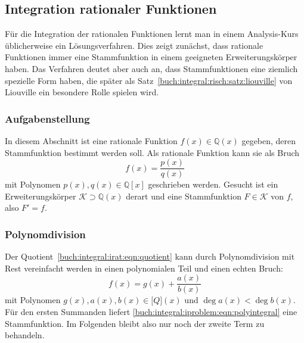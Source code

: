 %
%
%
\subsection{Integration rationaler Funktionen
\label{buch:integral:subsection:rationalefunktionen}}
Für die Integration der rationalen Funktionen lernt man in einem
Analysis-Kurs üblicherweise ein Lösungsverfahren.
Dies zeigt zunächst, dass rationale Funktionen immer eine Stammfunktion
in einem geeigneten Erweiterungskörper haben.
Das Verfahren deutet aber auch an, dass Stammfunktionen eine ziemlich spezielle
Form haben, die später als
Satz~\ref{buch:integral:risch:satz:liouville} von Liouville
ein besondere Rolle spielen wird.

%
%
\subsubsection{Aufgabenstellung}
In diesem Abschnitt ist eine rationale Funktion $f(x)\in\mathbb{Q}(x)$
gegeben, deren Stammfunktion bestimmt werden soll.
Als rationale Funktion kann sie als Bruch
\begin{equation}
f(x) = \frac{p(x)}{q(x)}
\label{buch:integral:irat:eqn:quotient}
\end{equation}
mit Polynomen $p(x),q(x)\in\mathbb{Q}[x]$ geschrieben werden.
Gesucht ist ein Erweiterungskörper $\mathscr{K}\supset \mathbb{Q}(x)$ 
derart und eine Stammfunktion $F\in\mathscr{K}$ von $f$, also $F'=f$.

%
%
\subsubsection{Polynomdivision}
Der Quotient~\eqref{buch:integral:irat:eqn:quotient} kann durch Polynomdivision
mit Rest vereinfacht werden in einen polynomialen Teil und einen echten
Bruch:
\begin{equation}
f(x)
=
g(x)
+
\frac{a(x)}{b(x)}
\label{buch:integral:irat:eqn:polydiv}
\end{equation}
mit Polynomen $g(x),a(x),b(x)\in\mathbb[Q](x)$ und $\deg a(x) < \deg b(x)$.
Für den ersten Summanden liefert
\eqref{buch:integral:iproblem:eqn:polyintegral} eine Stammfunktion.
Im Folgenden bleibt also nur noch der zweite Term zu behandeln.

%
%
